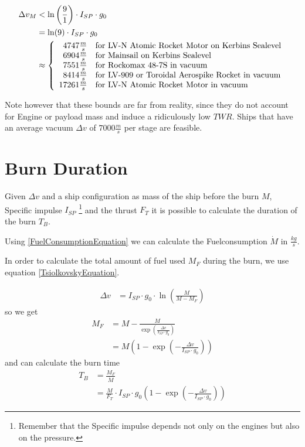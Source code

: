 \documentclass[11pt]{report}
\newcommand{\dv}{{\Delta}{v}}
\newcommand{\isp}{I_{SP}}
\begin{document}
\begin{align}
  \dv_M & < \ln\left(\frac{9}{1}\right) \cdot \isp \cdot g_0\nonumber\\
  & = \ln(9) \cdot \isp \cdot g_0\nonumber\\
  & \approx \left\{
    \begin{array}{r l}
      4747 \frac{m}{s} & \textrm{for LV-N Atomic Rocket Motor on Kerbins Sealevel}\\
      6904 \frac{m}{s} & \textrm{for Mainsail on Kerbins Sealevel}\\
      7551 \frac{m}{s} & \textrm{for Rockomax 48-7S in vacuum}\\
      8414 \frac{m}{s} & \textrm{for LV-909 or Toroidal Aerospike Rocket in vacuum}\\
      17261 \frac{m}{s} & \textrm{for LV-N Atomic Rocket Motor in vacuum}
    \end{array}
  \right.
\end{align}

Note however that these bounds are far from reality, since they do not
account for Engine or payload mass and induce a ridiculously low
$TWR$.  Ships that have an average vacuum $\dv$ of $7000 \frac{m}{s}$
per stage are feasible. \cite{DeltaVMaximizationChallenge}

\section{Burn Duration}

Given $\dv$ and a ship configuration as mass of the ship before
the burn $M$, Specific impulse $\isp$ \footnote{Remember that the
  Specific impulse depends not only on the engines but also on the
  pressure.} and the thrust $F_T$ it is possible to
calculate the duration of the burn $T_B$. 

Using \eqref{FuelConsumptionEquation} we can calculate the
Fuelconsumption $\dot{M}$ in $\frac{kg}{s}$.

In order to calculate the total amount of fuel used $M_F$ during the
burn, we use equation \eqref{TsiolkovskyEquation}.

\begin{align*}
  \dv & = \isp\cdot g_0 \cdot \ln\left(\frac{M}{M-M_F}\right)
\end{align*}
so we get
\begin{align}
  M_F & = M-\frac{M}{\exp\left(\frac{\dv}{\isp\cdot g_0}\right)}\nonumber\\
  & = M\left(1-\exp\left(-\frac{\dv}{\isp\cdot g_0}\right)\right)
\end{align}
and can calculate the burn time
\begin{align}
  T_B & = \frac{M_F}{\dot{M}}\nonumber\\
  & = \frac{M}{F_T}\cdot \isp \cdot g_0\left(1-\exp\left(-\frac{\dv}{\isp\cdot g_0}\right)\right)
\end{align}
\end{document}
